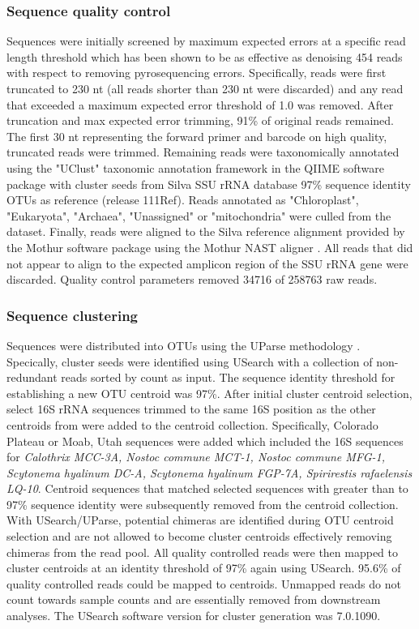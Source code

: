 \subsubsection{Sequence quality control} Sequences were initially screened by
maximum expected errors at a specific read length threshold \citep{23955772}
which has been shown to be as effective as denoising 454 reads with respect to
removing pyrosequencing errors. Specifically, reads were first truncated to 230
nt (all reads shorter than 230 nt were discarded) and any read that exceeded a
maximum expected error threshold of 1.0 was removed. After truncation and max
expected error trimming, 91\% of original reads remained. The first 30 nt
representing the forward primer and barcode on high quality, truncated reads
were trimmed. Remaining reads were taxonomically annotated using the "UClust"
taxonomic annotation framework in the QIIME software package \citep{20383131,
20709691} with cluster seeds from Silva SSU rRNA database \citep{17947321} 97\%
sequence identity OTUs as reference (release 111Ref). Reads annotated as
"Chloroplast", "Eukaryota", "Archaea", "Unassigned" or "mitochondria" were
culled from the dataset. Finally, reads were aligned to the Silva reference
alignment provided by the Mothur software package \citep{19801464} using the
Mothur NAST aligner \citep{16845035}. All reads that did not appear to align to
the expected amplicon region of the SSU rRNA gene were discarded. Quality
control parameters removed 34716 of 258763 raw reads.

\subsubsection{Sequence clustering}
Sequences were distributed into OTUs using the UParse methodology
\citep{23955772}. Specically, cluster seeds were identified using USearch with
a collection of non-redundant reads sorted by count as input. The sequence
identity threshold for establishing a new OTU centroid was 97\%. After initial
cluster centroid selection, select 16S rRNA sequences trimmed to the same 16S
position as the other centroids from \citet{Yeager} were added to the centroid
collection. Specifically, \citet{Yeager} Colorado Plateau or Moab, Utah
sequences were added which included the 16S sequences for \textit{Calothrix
MCC-3A, Nostoc commune MCT-1, Nostoc commune MFG-1, Scytonema hyalinum DC-A,
Scytonema hyalinum FGP-7A, Spirirestis rafaelensis LQ-10}. Centroid sequences
that matched selected \citet{Yeager} sequences with greater than to 97\%
sequence identity were subsequently removed from the centroid collection. With
USearch/UParse, potential chimeras are identified during OTU centroid selection
and are not allowed to become cluster centroids effectively removing chimeras
from the read pool. All quality controlled reads were then mapped to cluster
centroids at an identity threshold of 97\% again using USearch. 95.6\% of
quality controlled reads could be mapped to centroids. Unmapped reads do not
count towards sample counts and are essentially removed from downstream
analyses. The USearch software version for cluster generation was 7.0.1090.

